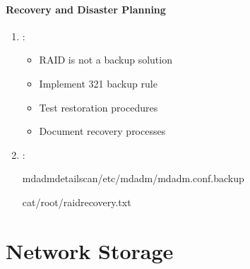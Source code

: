 \documentclass[letterpaper,10pt,english]{sphinxmanual}
\begin{document}
\subsubsection{Recovery and Disaster Planning}
\label{\detokenize{raid-systems:recovery-and-disaster-planning}}\begin{enumerate}
%
\item {} 
\sphinxAtStartPar
{}:
\begin{itemize}
\item {} 
\sphinxAtStartPar
RAID is not a backup solution

\item {} 
\sphinxAtStartPar
Implement 3\sphinxhyphen{}2\sphinxhyphen{}1 backup rule

\item {} 
\sphinxAtStartPar
Test restoration procedures

\item {} 
\sphinxAtStartPar
Document recovery processes

\end{itemize}

\item {} 
\sphinxAtStartPar
{}:

\begin{sphinxVerbatim}[commandchars=\\\{\}]
mdadm\PYGZhy{}\PYGZhy{}detail\PYGZhy{}\PYGZhy{}scan\PYGZgt{}/etc/mdadm/mdadm.conf.backup

cat\PYGZgt{}/root/raid\PYGZus{}recovery.txt

\end{sphinxVerbatim}

\end{enumerate}

\sphinxstepscope


\chapter{Network Storage}
\label{\detokenize{network-storage:network-storage}}\label{\detokenize{network-storage::doc}}
\end{document}
